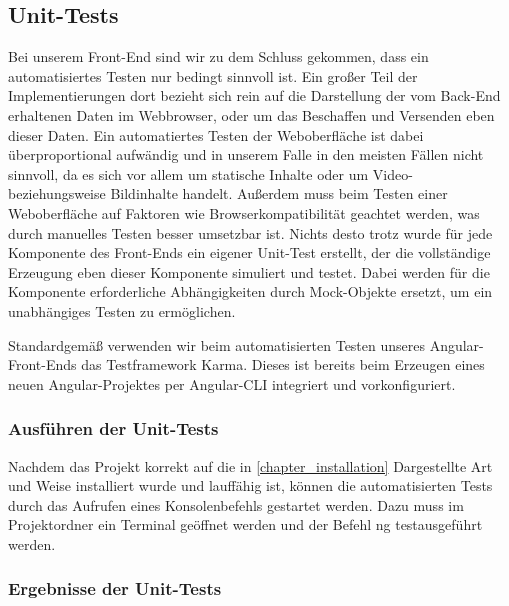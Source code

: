 \subsection{Unit-Tests}
Bei unserem Front-End sind wir zu dem Schluss gekommen, dass ein automatisiertes Testen nur bedingt sinnvoll ist. Ein großer Teil der Implementierungen dort bezieht sich rein auf die Darstellung der vom Back-End erhaltenen Daten im Webbrowser, oder um das Beschaffen und Versenden eben dieser Daten. Ein automatiertes Testen der Weboberfläche ist dabei überproportional aufwändig und in unserem Falle in den meisten Fällen nicht sinnvoll, da es sich vor allem um statische Inhalte oder um Video- beziehungsweise Bildinhalte handelt. Außerdem muss beim Testen einer Weboberfläche auf Faktoren wie Browserkompatibilität geachtet werden, was durch manuelles Testen besser umsetzbar ist. Nichts desto trotz wurde für jede Komponente des Front-Ends ein eigener Unit-Test erstellt, der die vollständige Erzeugung eben dieser Komponente simuliert und testet. Dabei werden für die Komponente erforderliche Abhängigkeiten durch Mock-Objekte ersetzt, um ein unabhängiges Testen zu ermöglichen.

Standardgemäß verwenden wir beim automatisierten Testen unseres Angular-Front-Ends das Testframework Karma. Dieses ist bereits beim Erzeugen eines neuen Angular-Projektes per Angular-\acs{CLI} integriert und vorkonfiguriert. 

\subsubsection{Ausführen der Unit-Tests}
Nachdem das Projekt korrekt auf die in \ref{chapter_installation} Dargestellte Art und Weise installiert wurde und lauffähig ist, können die automatisierten Tests durch das Aufrufen eines Konsolenbefehls gestartet werden. Dazu muss im Projektordner ein Terminal geöffnet werden und der Befehl \glqq{}ng test\grqq ausgeführt werden.

\subsubsection{Ergebnisse der Unit-Tests}

